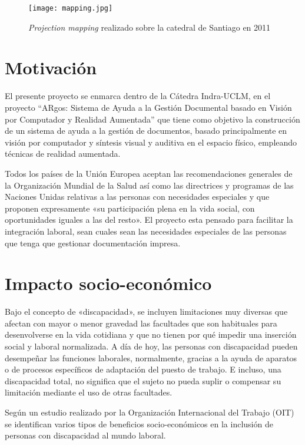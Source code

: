 \begin{figure} 
  \centering
  \texttt{[image: mapping.jpg]}
  \caption{\textit{Projection mapping} realizado sobre la catedral de Santiago en 2011}
  \label{fig:mapping}
\end{figure}

\section{Motivación}

El presente proyecto se enmarca dentro de la Cátedra Indra-UCLM, en el proyecto “ARgos: Sistema de Ayuda a la Gestión Documental basado en Visión por Computador y Realidad Aumentada” que tiene como objetivo la construcción de un sistema de ayuda a la gestión de documentos, basado principalmente en visión por computador y síntesis visual y auditiva en el espacio físico, empleando técnicas de realidad aumentada. 

Todos los países de la Unión Europea aceptan las recomendaciones generales de la Organización Mundial de la Salud así como las directrices y programas de las Naciones Unidas relativas a las personas con necesidades especiales y que proponen expresamente «su participación plena en la vida social, con oportunidades iguales a las del resto». El proyecto esta pensado para facilitar la integración laboral, sean cuales sean las necesidades especiales de las personas que tenga que gestionar documentación impresa. 
  
\section{Impacto socio-económico}
Bajo el concepto de «discapacidad», se incluyen limitaciones muy diversas que afectan con mayor o menor gravedad las facultades que son habituales para desenvolverse en la vida cotidiana y que no tienen por qué impedir una inserción social y laboral normalizada. A día de hoy, las personas con discapacidad pueden desempeñar las funciones laborales, normalmente, gracias a la ayuda de aparatos o de procesos específicos de adaptación del puesto de trabajo. E incluso, una discapacidad total, no significa que el sujeto no pueda suplir o compensar su limitación mediante el uso de otras facultades. 

Según un estudio \cite{OIT} realizado por la Organización Internacional del Trabajo (OIT) se identifican varios tipos de beneficios socio-económicos en la inclusión de personas con discapacidad al mundo laboral.

